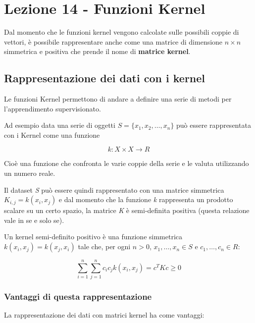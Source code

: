 \section{Lezione 14 - Funzioni Kernel}\label{lezione-14---funzioni-kernel}

Dal momento che le funzioni kernel vengono calcolate sulle possibili coppie di vettori, è possibile rappresentare anche come una matrice di dimensione $n \times n$ simmetrica e positiva che prende il nome di \textbf{matrice kernel}.

\subsection{Rappresentazione dei dati con i kernel}\label{rappresentazione-dei-dati-con-i-kernel}

Le funzioni Kernel permettono di andare a definire una serie di metodi
per l'apprendimento supervisionato.

Ad esempio data una serie di oggetti $S = \{x_1,x_2, \ldots , x_n\}$ può
essere rappresentata con i Kernel come una funzione

$$
k : X \times X \rightarrow R
$$

Cioè una funzione che confronta le varie coppie della serie e le valuta
utilizzando un numero reale.

Il dataset \emph{S} può essere quindi rappresentato con una matrice
simmetrica $K_{i,j} = k(x_i,x_j)$ e dal momento che la funzione
\emph{k} rappresenta un prodotto scalare su un certo spazio, la matrice
\emph{K} è semi-definita positiva (questa relazione vale in se e solo
se).

Un kernel semi-definito positivo è una funzione simmetrica $k(x_i,x_j) = k(x_j, x_i)$ tale che, per ogni $n > 0$, $x_1, \ldots, x_n \in S$ e $c_1, \ldots, c_n \in R$:

$$ \sum\limits_{i=1}^n \sum\limits_{j=1}^n c_i c_j k(x_i,x_j) = c^T K c \geq 0$$

\subsubsection{Vantaggi di questa rappresentazione}\label{vantaggi-di-questa-rappresentazione}

La rappresentazione dei dati con matrici kernel ha come vantaggi:

